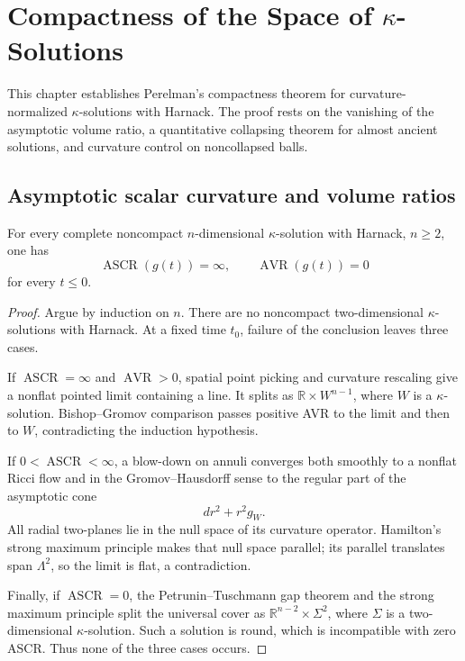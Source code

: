 \chapter{\texorpdfstring{Compactness of the Space of $\kappa$-Solutions}{Compactness of the Space of Kappa-Solutions}}
\label{ch:chow-iii-compactness-kappa-solutions}

This chapter establishes Perelman's compactness theorem for curvature-normalized
$\kappa$-solutions with Harnack.  The proof rests on the vanishing of the
asymptotic volume ratio, a quantitative collapsing theorem for almost ancient
solutions, and curvature control on noncollapsed balls.

\section{Asymptotic scalar curvature and volume ratios}

\begin{theorem}[$\kappa$-solutions with Harnack have ASCR $=\infty$ and AVR $=0$]
\label{thm:chow-iii-kappa-harnack-ascr-avr}
For every complete noncompact $n$-dimensional $\kappa$-solution with Harnack,
$n\ge2$, one has
\[
 \operatorname{ASCR}(g(t))=\infty,
 \qquad \operatorname{AVR}(g(t))=0
\]
for every $t\le0$.
\end{theorem}
\begin{proof}
Argue by induction on $n$.  There are no noncompact two-dimensional
$\kappa$-solutions with Harnack.  At a fixed time $t_0$, failure of the
conclusion leaves three cases.

If $\operatorname{ASCR}=\infty$ and $\operatorname{AVR}>0$, spatial point
picking and curvature rescaling give a nonflat pointed limit containing a
line.  It splits as $\mathbb R\times W^{n-1}$, where $W$ is a
$\kappa$-solution.  Bishop--Gromov comparison passes positive AVR to the
limit and then to $W$, contradicting the induction hypothesis.

If $0<\operatorname{ASCR}<\infty$, a blow-down on annuli converges both
smoothly to a nonflat Ricci flow and in the Gromov--Hausdorff sense to the
regular part of the asymptotic cone
\[
 dr^2+r^2g_W.
\]
All radial two-planes lie in the null space of its curvature operator.
Hamilton's strong maximum principle makes that null space parallel; its
parallel translates span $\Lambda^2$, so the limit is flat, a contradiction.

Finally, if $\operatorname{ASCR}=0$, the Petrunin--Tuschmann gap theorem and
the strong maximum principle split the universal cover as
$\mathbb R^{n-2}\times\Sigma^2$, where $\Sigma$ is a two-dimensional
$\kappa$-solution.  Such a solution is round, which is incompatible with
zero ASCR.  Thus none of the three cases occurs.
\end{proof}

